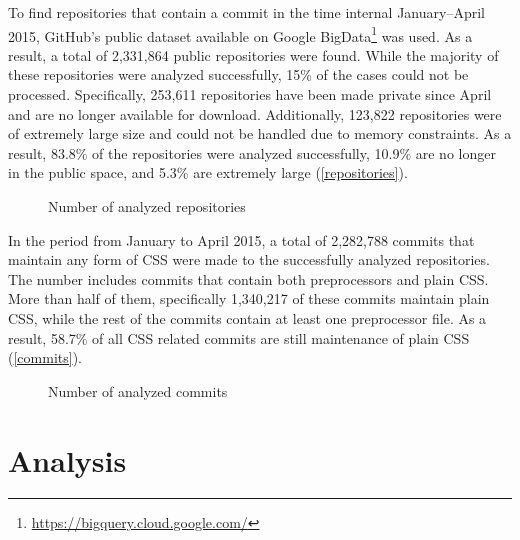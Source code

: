 To find repositories that contain a commit in the time internal January--April
2015, GitHub's public dataset available on Google
BigData\footnote{\url{https://bigquery.cloud.google.com/}} was used. As a result, a
total of 2,331,864 public repositories were found. While the majority of these
repositories were analyzed successfully, 15\% of the cases could not be
processed. Specifically, 253,611 repositories have been made private since
April and are no longer available for download. Additionally, 123,822
repositories were of extremely large size and could not be handled due to
memory constraints. As a result, 83.8\% of the repositories were analyzed
successfully, 10.9\% are no longer in the public space, and 5.3\% are
extremely large (\autoref{repositories}).

\begin{figure}
  \centering
  \caption{
    \label{repositories}
    Number of analyzed repositories}
\end{figure}


In the period from January to April 2015, a total of 2,282,788 commits that maintain
any form of CSS were made to the successfully analyzed repositories. The
number includes commits that contain both preprocessors and plain CSS. More
than half of them, specifically 1,340,217 of these commits maintain plain CSS,
while the rest of the commits contain at least one preprocessor file. As a
result, 58.7\% of all CSS related commits are still maintenance of plain CSS
(\autoref{commits}).

\begin{figure}
  \centering
  \caption{
    \label{commits}
  	Number of analyzed commits}
\end{figure}

\section{Analysis}

